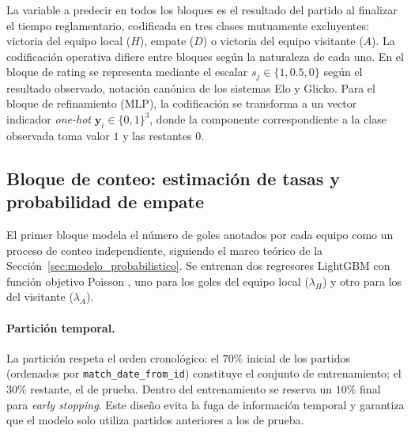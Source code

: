 La variable a predecir en todos los bloques es el resultado del partido al finalizar el tiempo reglamentario, codificada en tres clases mutuamente excluyentes: victoria del equipo local ($H$), empate ($D$) o victoria del equipo visitante ($A$). La codificaci\'on operativa difiere entre bloques seg\'un la naturaleza de cada uno. En el bloque de rating se representa mediante el escalar $s_j \in \{1, 0{.}5, 0\}$ seg\'un el resultado observado, notaci\'on can\'onica de los sistemas Elo y Glicko. Para el bloque de refinamiento (MLP), la codificaci\'on se transforma a un vector indicador \emph{one-hot} $\mathbf{y}_i \in \{0,1\}^3$, donde la componente correspondiente a la clase observada toma valor $1$ y las restantes $0$.

\subsection{Bloque de conteo: estimaci\'on de tasas y probabilidad de empate}
\label{subsec:conteo}

El primer bloque modela el n\'umero de goles anotados por cada equipo como un proceso de conteo independiente, siguiendo el marco te\'orico de la Secci\'on~\ref{sec:modelo_probabilistico}. Se entrenan dos regresores LightGBM con funci\'on objetivo Poisson \cite{ke2017lightgbm}, uno para los goles del equipo local ($\lambda_H$) y otro para los del visitante ($\lambda_A$).

\paragraph{Partici\'on temporal.} La partici\'on respeta el orden cronol\'ogico: el $70\%$ inicial de los partidos (ordenados por \texttt{match\_date\_from\_id}) constituye el conjunto de entrenamiento; el $30\%$ restante, el de prueba. Dentro del entrenamiento se reserva un $10\%$ final para \emph{early stopping}. Este dise\~no evita la fuga de informaci\'on temporal y garantiza que el modelo solo utiliza partidos anteriores a los de prueba.

